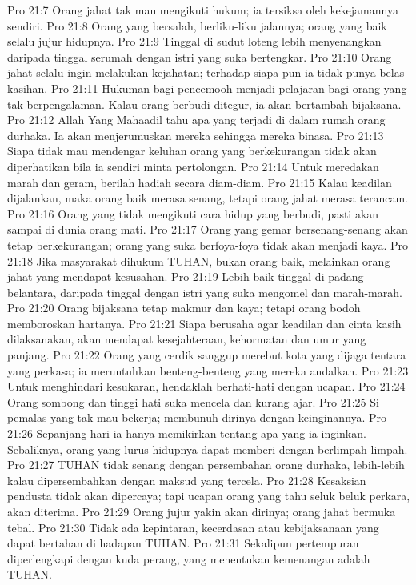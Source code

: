 Pro 21:7  Orang jahat tak mau mengikuti hukum; ia tersiksa oleh kekejamannya sendiri.
Pro 21:8  Orang yang bersalah, berliku-liku jalannya; orang yang baik selalu jujur hidupnya.
Pro 21:9  Tinggal di sudut loteng lebih menyenangkan daripada tinggal serumah dengan istri yang suka bertengkar.
Pro 21:10  Orang jahat selalu ingin melakukan kejahatan; terhadap siapa pun ia tidak punya belas kasihan.
Pro 21:11  Hukuman bagi pencemooh menjadi pelajaran bagi orang yang tak berpengalaman. Kalau orang berbudi ditegur, ia akan bertambah bijaksana.
Pro 21:12  Allah Yang Mahaadil tahu apa yang terjadi di dalam rumah orang durhaka. Ia akan menjerumuskan mereka sehingga mereka binasa.
Pro 21:13  Siapa tidak mau mendengar keluhan orang yang berkekurangan tidak akan diperhatikan bila ia sendiri minta pertolongan.
Pro 21:14  Untuk meredakan marah dan geram, berilah hadiah secara diam-diam.
Pro 21:15  Kalau keadilan dijalankan, maka orang baik merasa senang, tetapi orang jahat merasa terancam.
Pro 21:16  Orang yang tidak mengikuti cara hidup yang berbudi, pasti akan sampai di dunia orang mati.
Pro 21:17  Orang yang gemar bersenang-senang akan tetap berkekurangan; orang yang suka berfoya-foya tidak akan menjadi kaya.
Pro 21:18  Jika masyarakat dihukum TUHAN, bukan orang baik, melainkan orang jahat yang mendapat kesusahan.
Pro 21:19  Lebih baik tinggal di padang belantara, daripada tinggal dengan istri yang suka mengomel dan marah-marah.
Pro 21:20  Orang bijaksana tetap makmur dan kaya; tetapi orang bodoh memboroskan hartanya.
Pro 21:21  Siapa berusaha agar keadilan dan cinta kasih dilaksanakan, akan mendapat kesejahteraan, kehormatan dan umur yang panjang.
Pro 21:22  Orang yang cerdik sanggup merebut kota yang dijaga tentara yang perkasa; ia meruntuhkan benteng-benteng yang mereka andalkan.
Pro 21:23  Untuk menghindari kesukaran, hendaklah berhati-hati dengan ucapan.
Pro 21:24  Orang sombong dan tinggi hati suka mencela dan kurang ajar.
Pro 21:25  Si pemalas yang tak mau bekerja; membunuh dirinya dengan keinginannya.
Pro 21:26  Sepanjang hari ia hanya memikirkan tentang apa yang ia inginkan. Sebaliknya, orang yang lurus hidupnya dapat memberi dengan berlimpah-limpah.
Pro 21:27  TUHAN tidak senang dengan persembahan orang durhaka, lebih-lebih kalau dipersembahkan dengan maksud yang tercela.
Pro 21:28  Kesaksian pendusta tidak akan dipercaya; tapi ucapan orang yang tahu seluk beluk perkara, akan diterima.
Pro 21:29  Orang jujur yakin akan dirinya; orang jahat bermuka tebal.
Pro 21:30  Tidak ada kepintaran, kecerdasan atau kebijaksanaan yang dapat bertahan di hadapan TUHAN.
Pro 21:31  Sekalipun pertempuran diperlengkapi dengan kuda perang, yang menentukan kemenangan adalah TUHAN.
